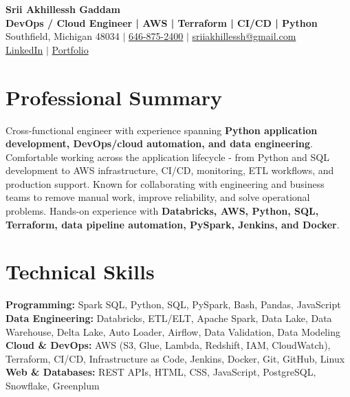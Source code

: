 \documentclass[letterpaper,10pt]{article}
\begin{document}
\fontsize{9.35pt}{10.45pt}\selectfont

\begin{center}
    {\LARGE \textbf{Srii Akhillessh Gaddam}} \\[-1pt]
    \textbf{DevOps / Cloud Engineer | AWS | Terraform | CI/CD | Python} \\[2pt]
    Southfield, Michigan 48034 $|$
    \href{tel:6468752400}{646-875-2400} $|$
    \href{mailto:sriiakhillessh@gmail.com}{sriiakhillessh@gmail.com} \\[1pt]
    \href{https://www.linkedin.com/in/srii-akhiilessh-gaddam-b48668191/}{LinkedIn} $|$
    \href{https://sriiakhillesshg.github.io/portfolio/}{Portfolio}
\end{center}
\vspace{-8pt}

\section{Professional Summary}
\small{Cross-functional engineer with experience spanning \textbf{Python application development, DevOps/cloud automation, and data engineering}. Comfortable working across the application lifecycle - from Python and SQL development to AWS infrastructure, CI/CD, monitoring, ETL workflows, and production support. Known for collaborating with engineering and business teams to remove manual work, improve reliability, and solve operational problems. Hands-on experience with \textbf{Databricks, AWS, Python, SQL, Terraform, data pipeline automation, PySpark, Jenkins, and Docker}.}

\section{Technical Skills}
\small{
\textbf{Programming:} Spark SQL, Python, SQL, PySpark, Bash, Pandas, JavaScript \\
\textbf{Data Engineering:} Databricks, ETL/ELT, Apache Spark, Data Lake, Data Warehouse, Delta Lake, Auto Loader, Airflow, Data Validation, Data Modeling \\
\textbf{Cloud \& DevOps:} AWS (S3, Glue, Lambda, Redshift, IAM, CloudWatch), Terraform, CI/CD, Infrastructure as Code, Jenkins, Docker, Git, GitHub, Linux \\
\textbf{Web \& Databases:} REST APIs, HTML, CSS, JavaScript, PostgreSQL, Snowflake, Greenplum
}
\end{document}
